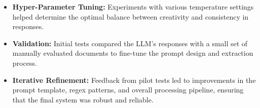 \documentclass[../main.tex]{subfiles}
\begin{document}
\begin{itemize}
    \item \textbf{Hyper-Parameter Tuning:}
 Experiments with various temperature settings helped determine the optimal balance between creativity and consistency in responses.
    \item \textbf{Validation:}
 Initial tests compared the LLM’s responses with a small set of manually evaluated documents to fine-tune the prompt design and extraction process.
    \item \textbf{Iterative Refinement:}
 Feedback from pilot tests led to improvements in the prompt template, regex patterns, and overall processing pipeline, ensuring that the final system was robust and reliable.
\end{itemize}


\ifSubfilesClassLoaded{
    
    
}{}
\end{document}
